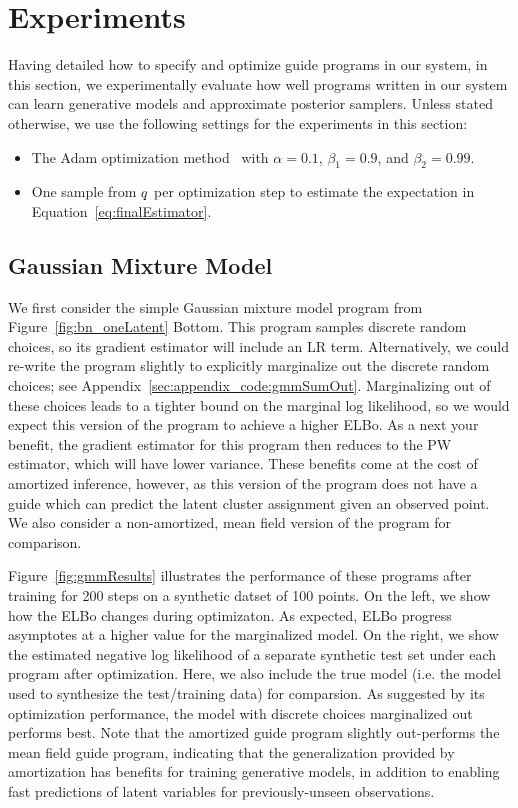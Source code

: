 \section{Experiments}
\label{sec:results}

Having detailed how to specify and optimize guide programs in our system, in this section, we experimentally evaluate how well programs written in our system can learn generative models and approximate posterior samplers. Unless stated otherwise, we use the following settings for the experiments in this section:
\begin{itemize}
\item{The Adam optimization method~\cite{Adam} with $\alpha = 0.1$, $\beta_1 = 0.9$, and $\beta_2 = 0.99$.}
\item{One sample from $q$ per optimization step to estimate the expectation in Equation~\ref{eq:finalEstimator}.}
\end{itemize}

\subsection{Gaussian Mixture Model}
\label{sec:results_gmm}

We first consider the simple Gaussian mixture model program from Figure~\ref{fig:bn_oneLatent} Bottom. This program samples discrete random choices, so its gradient estimator will include an LR term. Alternatively, we could re-write the program slightly to explicitly marginalize out the discrete random choices; see Appendix~\ref{sec:appendix_code:gmmSumOut}.
Marginalizing out of these choices leads to a tighter bound on the marginal log likelihood, so we would expect this version of the program to achieve a higher ELBo.
As a next your benefit, the gradient estimator for this program then reduces to the PW estimator, which will have lower variance. These benefits come at the cost of amortized inference, however, as this version of the program does not have a guide which can predict the latent cluster assignment given an observed point. We also consider a non-amortized, mean field version of the program for comparison.

Figure~\ref{fig:gmmResults} illustrates the performance of these programs after training for 200 steps on a synthetic datset of 100 points. On the left, we show how the ELBo changes during optimizaton.
As expected, ELBo progress asymptotes at a higher value for the marginalized model.
On the right, we show the estimated negative log likelihood of a separate synthetic test set under each program after optimization. Here, we also include the true model (i.e. the model used to synthesize the test/training data) for comparsion.
As suggested by its optimization performance, the model with discrete choices marginalized out performs best.
Note that the amortized guide program slightly out-performs the mean field guide program, indicating that the generalization provided by amortization has benefits for training generative models, in addition to enabling fast predictions of latent variables for previously-unseen observations.

